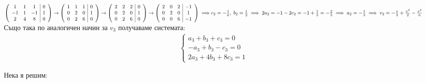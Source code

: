 \documentclass[12pt]{article}
\begin{document}
$\left(\begin{array}{ccc|c}
     1 & 1 &  1 & 0 \\
    -1 & 1 & -1 & 1 \\
     2 & 4 &  8 & 0
\end{array}\right) \to \left(\begin{array}{ccc|c}
    1 & 1 & 1 & 0 \\
    0 & 2 & 0 & 1 \\
    0 & 2 & 6 & 0
\end{array}\right) \to \left(\begin{array}{ccc|c}
    2 & 2 & 2 & 0 \\
    0 & 2 & 0 & 1 \\
    0 & 2 & 6 & 0
\end{array}\right) \to \left(\begin{array}{ccc|c}
    2 & 0 & 2 & -1 \\
    0 & 2 & 0 &  1 \\
    0 & 0 & 6 & -1
\end{array}\right) \implies \\\\
c_2 = -\frac{1}{6}, \; b_2 = \frac{1}{2} \implies 2a_2 = -1 - 2c_2 = -1 + \frac{1}{3} = -\frac{2}{3} \implies a_2 = -\frac{1}{3} \implies v_2 = -\frac{x}{3} + \frac{x^2}{2} - \frac{x^3}{6}$ \\

Също така по аналогичен начин за $v_3$ получаваме системата:
\begin{align*}
    \begin{cases}
         a_3 +  b_3 + c_3 = 0 \\
        -a_3 +  b_3 -  c_3 = 0 \\
        2a_3 + 4b_3 + 8c_3 = 1
    \end{cases}
\end{align*}

Нека я решим: \\
\end{document}

